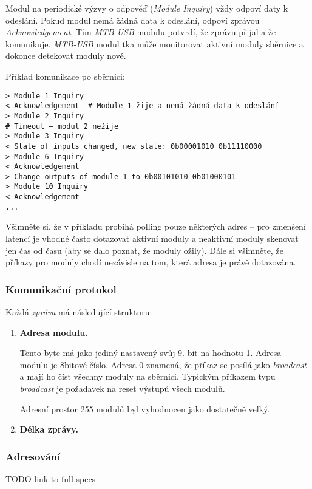 Modul na periodické výzvy o odpověď (\textit{Module Inquiry}) vždy odpoví daty
k odeslání. Pokud modul nemá žádná data k odeslání, odpoví zprávou
\textit{Acknowledgement}. Tím \textit{MTB-USB} modulu potvrdí, že zprávu přijal
a že komunikuje. \textit{MTB-USB} modul tka může monitorovat aktivní moduly
sběrnice a dokonce detekovat moduly nové.

Příklad komunikace po sběrnici:

\begin{verbatim}
> Module 1 Inquiry
< Acknowledgement  # Module 1 žije a nemá žádná data k odeslání
> Module 2 Inquiry
# Timeout – modul 2 nežije
> Module 3 Inquiry
< State of inputs changed, new state: 0b00001010 0b11110000
> Module 6 Inquiry
< Acknowledgement
> Change outputs of module 1 to 0b00101010 0b01000101
> Module 10 Inquiry
< Acknowledgement
...
\end{verbatim}

Všimněte si, že v příkladu probíhá polling pouze některých adres – pro zmenšení
latencí je vhodné často dotazovat aktivní moduly a neaktivní moduly skenovat
jen čas od času (aby se dalo poznat, že moduly ožily). Dále si všimněte, že
příkazy pro moduly chodí nezávisle na tom, která adresa je právě dotazována.

\subsubsection{Komunikační protokol}

Každá \textit{zpráva} má následující strukturu:

\begin{enumerate}
\item \textbf{Adresa modulu.}

Tento byte má jako jediný nastavený svůj 9. bit na hodnotu 1.
Adresa modulu je 8bitové číslo. Adresa 0 znamená, že příkaz se posílá
jako \textit{broadcast} a mají ho číst všechny moduly na sběrnici. Typickým
příkazem typu \textit{broadcast} je požadavek na reset výstupů všech modulů.

Adresní prostor 255 modulů byl vyhodnocen jako dostatečně velký.

\item \textbf{Délka zprávy.}
\end{enumerate}

\subsubsection{Adresování}


TODO link to full specs

